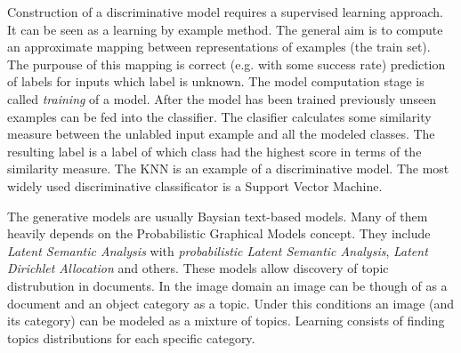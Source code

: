 \documentclass[a4paper,12pt]{article}
\begin{document}
	Construction of a discriminative model requires a supervised learning approach. It can be seen as a learning by example method. The general aim is to compute an approximate mapping between representations of examples (the train set). The purpouse of this mapping is correct (e.g. with some success rate) prediction of labels for inputs which label is unknown. The model computation stage is called \emph{training} of a model. After the model has been trained previously unseen examples can be fed into the classifier. The clasifier calculates some similarity measure between the unlabled input example and all the modeled classes. The resulting label is a label of which class had the highest score in terms of the similarity measure. The KNN is an example of a discriminative model. The most widely used discriminative classificator is a Support Vector Machine.
	
	The generative models are usually Baysian text-based models. Many of them heavily depends on the Probabilistic Graphical Models concept. They include \emph{Latent Semantic Analysis} with \emph{probabilistic Latent Semantic Analysis}, \emph{Latent Dirichlet Allocation} and others. These models allow discovery of topic distrubution in documents. In the image domain an image can be though of as a document and an object category as a topic. Under this conditions an image (and its category) can be modeled as a mixture of topics. Learning consists of finding topics distributions for each specific category. 


\end{document}
